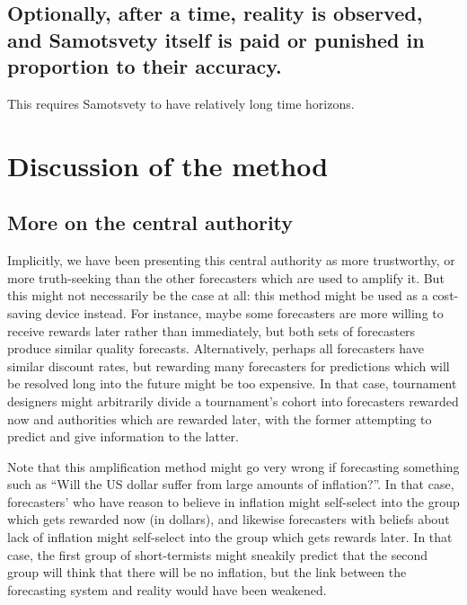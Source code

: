 \documentclass[]{article}
\begin{document}
\hypertarget{optionally-after-a-time-reality-is-observed-and-samotsvety-itself-is-paid-or-punished-in-proportion-to-their-accuracy.}{%
\subsection{Optionally, after a time, reality is observed, and
Samotsvety itself is paid or punished in proportion to their
accuracy.}\label{optionally-after-a-time-reality-is-observed-and-samotsvety-itself-is-paid-or-punished-in-proportion-to-their-accuracy.}}

This requires Samotsvety to have relatively long time horizons.

\hypertarget{discussion-of-the-method}{%
\section{Discussion of the method}\label{discussion-of-the-method}}

\hypertarget{more-on-the-central-authority}{%
\subsection{More on the central
authority}\label{more-on-the-central-authority}}

Implicitly, we have been presenting this central authority as more
trustworthy, or more truth-seeking than the other forecasters which are
used to amplify it. But this might not necessarily be the case at all:
this method might be used as a cost-saving device instead. For instance,
maybe some forecasters are more willing to receive rewards later rather
than immediately, but both sets of forecasters produce similar quality
forecasts. Alternatively, perhaps all forecasters have similar discount
rates, but rewarding many forecasters for predictions which will be
resolved long into the future might be too expensive. In that case,
tournament designers might arbitrarily divide a tournament's cohort into
forecasters rewarded now and authorities which are rewarded later, with
the former attempting to predict and give information to the latter.

Note that this amplification method might go very wrong if forecasting
something such as ``Will the US dollar suffer from large amounts of
inflation?''. In that case, forecasters' who have reason to believe in
inflation might self-select into the group which gets rewarded now (in
dollars), and likewise forecasters with beliefs about lack of inflation
might self-select into the group which gets rewards later. In that case,
the first group of short-termists might sneakily predict that the second
group will think that there will be no inflation, but the link between
the forecasting system and reality would have been weakened.
\end{document}
